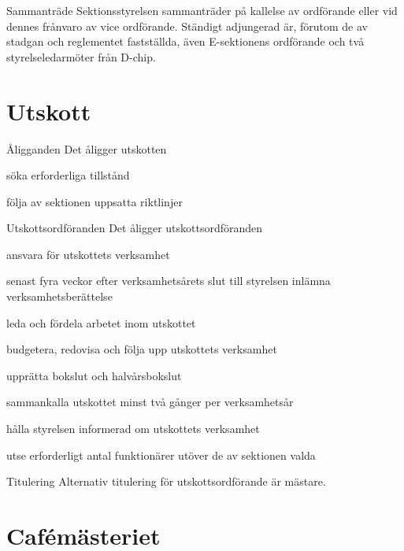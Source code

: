 \documentclass[pdfbookmarks,a4paper,11pt]{article}
\newlength{\itemcollength}
\newenvironment{reglemlista}{%
  \begin{list}{}{%
      \setlength{\labelwidth}{\itemcollength}%
      \setlength{\leftmargin}{\labelwidth + \labelsep}%
      \renewcommand{\makelabel}[1]{%
        \raisebox{0pt}[1ex][0pt]{%
          \makebox[\labelwidth][l]{%
            \parbox[t]{\itemcollength}{%
              \raggedright\hspace{0pt}##1}}}\hfill}%
      }}{%
  \end{list}}
\begin{document}
\begin{reglemlista}
	\item[Sammanträde]
	Sektionsstyrelsen sammanträder på kallelse av ordförande eller vid dennes frånvaro av vice ordförande. Ständigt adjungerad är, förutom de av stadgan och reglementet fastställda, även E-sektionens ordförande och två styrelseledarmöter från D-chip.

\end{reglemlista}

\section{Utskott}

\begin{reglemlista}

	\item[Åligganden]
	Det åligger utskotten
	\begin{attlista}
		\item söka erforderliga tillstånd
		\item följa av sektionen uppsatta riktlinjer
	\end{attlista}

	\item[Utskottsordföranden]
	Det åligger utskottsordföranden
	\begin{attlista}
		\item ansvara för utskottets verksamhet
		\item senast fyra veckor efter verksamhetsårets slut till styrelsen inlämna verksamhetsberättelse
		\item leda och fördela arbetet inom utskottet
		\item budgetera, redovisa och följa upp utskottets verksamhet
		\item upprätta bokslut och halvårsbokslut
		\item sammankalla utskottet minst två gånger per verksamhetsår
		\item hålla styrelsen informerad om utskottets verksamhet
		\item utse erforderligt antal funktionärer utöver de av sektionen valda
	\end{attlista}

	\item[Titulering]
	Alternativ titulering för utskottsordförande är mästare.

\end{reglemlista}

\section{Cafémästeriet}
\end{document}
